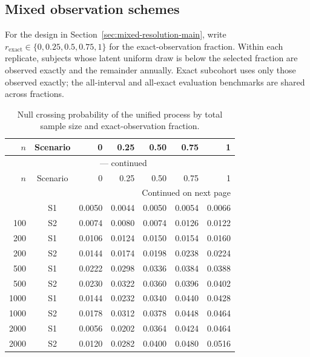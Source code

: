 \documentclass[12pt]{article}
\theoremstyle{definition}
\theoremstyle{remark}
\begin{document}
\subsection{Mixed observation schemes}
\label{sec:app-mixed-resolution}
For the design in Section~\ref{sec:mixed-resolution-main}, write $r_{\mathrm{exact}}\in\{0,0.25,0.5,0.75,1\}$ for the exact-observation fraction. Within each replicate, subjects whose latent uniform draw is below the selected fraction are observed exactly and the remainder annually. Exact subcohort uses only those observed exactly; the all-interval and all-exact evaluation benchmarks are shared across fractions.
\par
\begingroup
\scriptsize
\setlength{\tabcolsep}{3pt}
\renewcommand{\arraystretch}{1.10}
\setlength{\LTcapwidth}{\textwidth}
\begin{longtable}{rcrrrrr}
\caption{Null crossing probability of the unified process by total sample size and exact-observation fraction.}\label{tab:app-mixed-null}\\
\toprule
$n$ & Scenario & 0 & 0.25 & 0.50 & 0.75 & 1 \\
\midrule
\endfirsthead
\multicolumn{7}{c}{\tablename\ \thetable{} --- continued}\\
\toprule
$n$ & Scenario & 0 & 0.25 & 0.50 & 0.75 & 1 \\
\midrule
\endhead
\midrule
\multicolumn{7}{r}{Continued on next page}\\
\endfoot
\bottomrule
\endlastfoot
100 & S1 & 0.0050 & 0.0044 & 0.0050 & 0.0054 & 0.0066 \\
100 & S2 & 0.0074 & 0.0080 & 0.0074 & 0.0126 & 0.0122 \\
200 & S1 & 0.0106 & 0.0124 & 0.0150 & 0.0154 & 0.0160 \\
200 & S2 & 0.0144 & 0.0174 & 0.0198 & 0.0238 & 0.0224 \\
500 & S1 & 0.0222 & 0.0298 & 0.0336 & 0.0384 & 0.0388 \\
500 & S2 & 0.0230 & 0.0322 & 0.0360 & 0.0396 & 0.0402 \\
1000 & S1 & 0.0144 & 0.0232 & 0.0340 & 0.0440 & 0.0428 \\
1000 & S2 & 0.0178 & 0.0312 & 0.0378 & 0.0448 & 0.0464 \\
2000 & S1 & 0.0056 & 0.0202 & 0.0364 & 0.0424 & 0.0464 \\
2000 & S2 & 0.0120 & 0.0282 & 0.0400 & 0.0480 & 0.0516 \\
\end{longtable}
\endgroup
\end{document}
